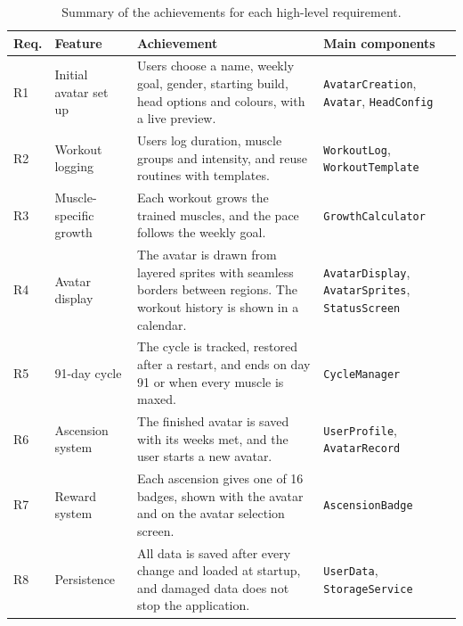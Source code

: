 \documentclass[11pt]{article}
\begin{document}
\begin{table}[H]
\centering
\renewcommand{\arraystretch}{1.3}
\begin{tabular}{|p{}|p{}|p{}|p{}|}
\hline
\textbf{Req.} & \textbf{Feature} & \textbf{Achievement} & \textbf{Main components} \\ \hline
R1 & Initial avatar set up & Users choose a name, weekly goal, gender, starting build, head options and colours, with a live preview. & \texttt{AvatarCreation}, \texttt{Avatar}, \texttt{HeadConfig} \\ \hline
R2 & Workout logging & Users log duration, muscle groups and intensity, and reuse routines with templates. & \texttt{WorkoutLog}, \texttt{WorkoutTemplate} \\ \hline
R3 & Muscle-specific growth & Each workout grows the trained muscles, and the pace follows the weekly goal. & \texttt{GrowthCalculator} \\ \hline
R4 & Avatar display & The avatar is drawn from layered sprites with seamless borders between regions. The workout history is shown in a calendar. & \texttt{AvatarDisplay}, \texttt{AvatarSprites}, \texttt{StatusScreen} \\ \hline
R5 & 91-day cycle & The cycle is tracked, restored after a restart, and ends on day 91 or when every muscle is maxed. & \texttt{CycleManager} \\ \hline
R6 & Ascension system & The finished avatar is saved with its weeks met, and the user starts a new avatar. & \texttt{UserProfile}, \texttt{AvatarRecord} \\ \hline
R7 & Reward system & Each ascension gives one of 16 badges, shown with the avatar and on the avatar selection screen. & \texttt{AscensionBadge} \\ \hline
R8 & Persistence & All data is saved after every change and loaded at startup, and damaged data does not stop the application. & \texttt{UserData}, \texttt{StorageService} \\ \hline
\end{tabular}
\caption{Summary of the achievements for each high-level requirement.}
\label{tab:achievements}
\end{table}
\end{document}
